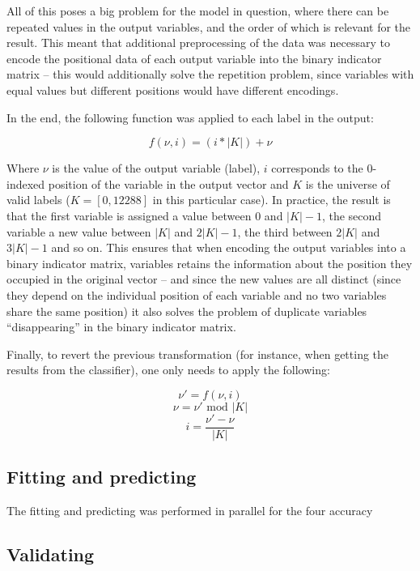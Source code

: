 \documentclass{kthreport}
\theoremstyle{definition}
\begin{document}
All of this poses a big problem for the model in question, where there can be repeated values in the output variables, and the order of which is relevant for the result. This meant that additional preprocessing of the data was necessary to encode the positional data of each output variable into the binary indicator matrix -- this would additionally solve the repetition problem, since variables with equal values but different positions would have different encodings.

In the end, the following function was applied to each label in the output:

\[ f(\nu, i) = (i * |K|) + \nu \]

Where $\nu$ is the value of the output variable (label), $i$ corresponds to the $0$-indexed position of the variable in the output vector and $K$ is the universe of valid labels ($K = [0, 12288]$ in this particular case). 
In practice, the result is that the first variable is assigned a value between $0$ and $|K| - 1$, the second variable a new value between $|K|$ and $2|K| - 1$, the third between $2|K|$ and $3|K| - 1$ and so on. 
This ensures that when encoding the output variables into a binary indicator matrix, variables retains the information about the position they occupied in the original vector -- and since the new values are all distinct (since they depend on the individual position of each variable and no two variables share the same position) it also solves the problem of duplicate variables ``disappearing'' in the binary indicator matrix.

Finally, to revert the previous transformation (for instance, when getting the results from the classifier), one only needs to apply the following:

\[ \nu' = f(\nu, i) \]
\[ \nu = \nu' \text{ mod } |K| \]
\[ i = \frac{\nu' - \nu}{|K|} \]

\subsection{Fitting and predicting}

The fitting and predicting was performed in parallel for the four accuracy 

\subsection{Validating}

\printbibliography
\end{document}
